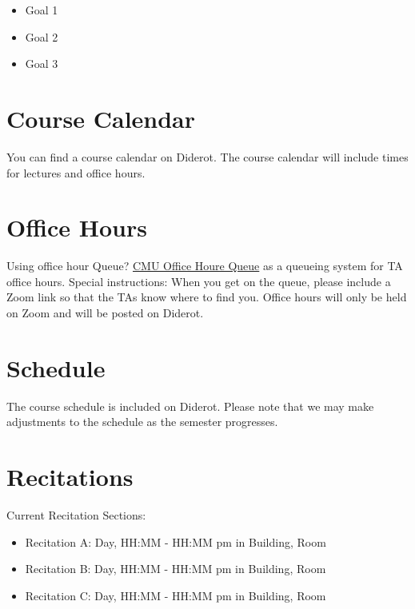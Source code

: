 \begin{gram}

\begin{itemize}
\item Goal 1
\item Goal 2
\item Goal 3
\end{itemize}
\end{gram}

\section{Course Calendar}

You can find a course calendar on Diderot.
%
The course calendar will include times for lectures and office hours.
                
\section{Office Hours}

Using office hour Queue?
\href{https://cmu.ohqueue.com}{CMU Office Houre Queue} 
as a queueing system for TA office hours. 
%
Special instructions: 
When you get on the queue, please include a Zoom link so that the TAs know where to find you. 
%
Office hours will only be held on Zoom and will be posted on Diderot.

\section{Schedule}


The course schedule is included on  Diderot. 
%
Please note that we may make adjustments to the schedule as the
semester progresses.

\section{Recitations}
\label{sec:recitations}

\begin{gram}

Current Recitation Sections:
\begin{itemize} 
\item Recitation A: Day, HH:MM - HH:MM pm in Building, Room
\item Recitation B: Day, HH:MM - HH:MM pm in Building, Room
\item Recitation C: Day, HH:MM - HH:MM pm in Building, Room
\end{itemize}
\end{gram}

